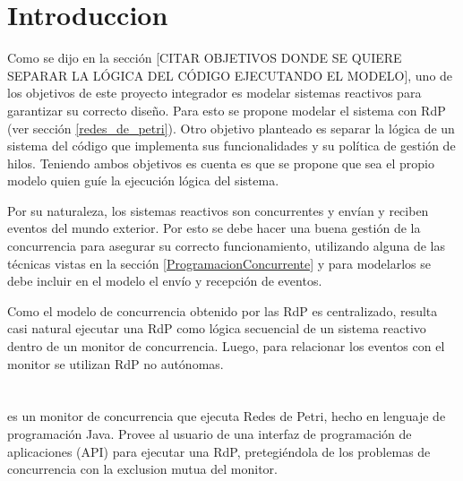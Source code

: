 \section{Introduccion}
\label{sec:petri_concurrency_monitor_intro}
Como se dijo en la sección [{\color{red}CITAR OBJETIVOS DONDE SE QUIERE
SEPARAR LA LÓGICA DEL CÓDIGO EJECUTANDO EL MODELO}], uno de los objetivos de
este proyecto integrador es modelar sistemas reactivos para garantizar su
correcto diseño.
Para esto se propone modelar el sistema con RdP (ver sección \ref{redes_de_petri}).
Otro objetivo planteado es separar la lógica de un sistema del código que
implementa sus funcionalidades y su política de gestión de hilos.
Teniendo ambos objetivos es cuenta es que se propone que sea el propio modelo
quien guíe la ejecución lógica del sistema.

Por su naturaleza, los sistemas reactivos son concurrentes y envían y reciben
eventos del mundo exterior.
Por esto se debe hacer una buena gestión de la concurrencia para asegurar su correcto
funcionamiento, utilizando alguna de las técnicas vistas en
la sección \ref{ProgramacionConcurrente} y para modelarlos se debe incluir en
el modelo el envío y recepción de eventos.

Como el modelo de concurrencia obtenido por las RdP es centralizado, resulta
casi natural ejecutar una RdP como lógica secuencial de un sistema reactivo
dentro de un monitor de concurrencia. Luego, para relacionar los eventos con el
monitor se utilizan RdP no autónomas.

\section{\javapetriconcurrencymonitor}
\label{sec:java_petri_concurrency_monitor}

\javapetriconcurrencymonitor es un monitor de concurrencia que ejecuta Redes
de Petri, hecho en lenguaje de programación Java.
Provee al usuario de una interfaz de programación de aplicaciones (API) para
ejecutar una RdP, pretegiéndola de los problemas de concurrencia con la
exclusion mutua del monitor.

